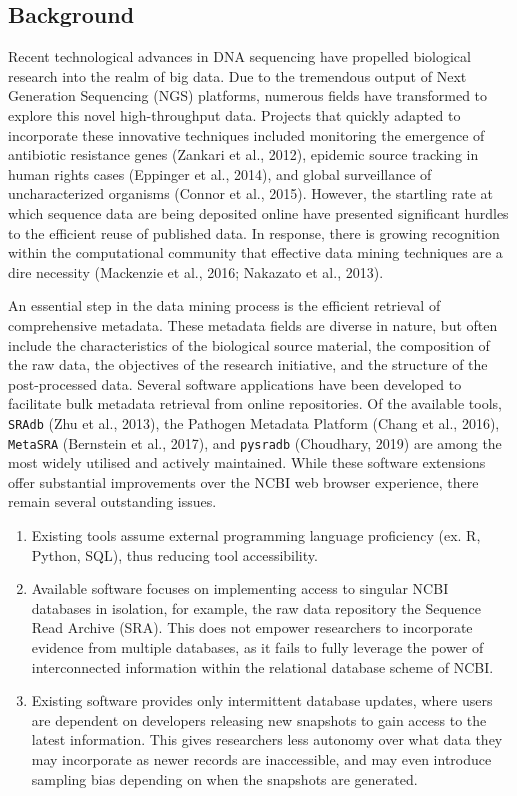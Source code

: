 \documentclass[
]{article}
\providecommand{\tightlist}{%
	\setlength{\itemsep}{0pt}\setlength{\parskip}{0pt}}
\begin{document}
\hypertarget{sec:background}{%
\subsection{Background}\label{sec:background}}

Recent technological advances in DNA sequencing have propelled
biological research into the realm of big data. Due to the tremendous
output of Next Generation Sequencing (NGS) platforms, numerous fields
have transformed to explore this novel high-throughput data. Projects
that quickly adapted to incorporate these innovative techniques included
monitoring the emergence of antibiotic resistance genes (Zankari et al.,
2012), epidemic source tracking in human rights cases (Eppinger et al.,
2014), and global surveillance of uncharacterized organisms (Connor et
al., 2015). However, the startling rate at which sequence data are being
deposited online have presented significant hurdles to the efficient
reuse of published data. In response, there is growing recognition
within the computational community that effective data mining techniques
are a dire necessity (Mackenzie et al., 2016; Nakazato et al., 2013).

An essential step in the data mining process is the efficient retrieval
of comprehensive metadata. These metadata fields are diverse in nature,
but often include the characteristics of the biological source material,
the composition of the raw data, the objectives of the research
initiative, and the structure of the post-processed data. Several
software applications have been developed to facilitate bulk metadata
retrieval from online repositories. Of the available tools,
\texttt{SRAdb} (Zhu et al., 2013), the Pathogen Metadata Platform (Chang
et al., 2016), \texttt{MetaSRA} (Bernstein et al., 2017), and
\texttt{pysradb} (Choudhary, 2019) are among the most widely utilised
and actively maintained. While these software extensions offer
substantial improvements over the NCBI web browser experience, there
remain several outstanding issues.

\begin{enumerate}
\def\labelenumi{\arabic{enumi}.}
\tightlist
\item
  Existing tools assume external programming language proficiency (ex.
  R, Python, SQL), thus reducing tool accessibility.
\item
  Available software focuses on implementing access to singular NCBI
  databases in isolation, for example, the raw data repository the
  Sequence Read Archive (SRA). This does not empower researchers to
  incorporate evidence from multiple databases, as it fails to fully
  leverage the power of interconnected information within the relational
  database scheme of NCBI.
\item
  Existing software provides only intermittent database updates, where
  users are dependent on developers releasing new snapshots to gain
  access to the latest information. This gives researchers less autonomy
  over what data they may incorporate as newer records are inaccessible,
  and may even introduce sampling bias depending on when the snapshots
  are generated.
\end{enumerate}
\end{document}
